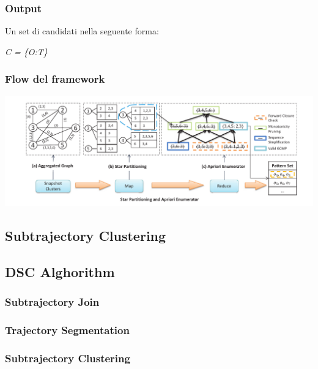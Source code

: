 \documentclass{beamer}
\begin{document}
\begin{frame}
	\frametitle{Output}
	Un set di candidati nella seguente forma: 
	
	\begin{center}
		\huge  \textit{C = \{O:T\}} 
	\end{center}




	
	
\end{frame}

\begin{frame}
	\frametitle{Flow del framework}

\includegraphics[scale=0.25]{GCMP-flow}
	
\end{frame}




\subsection{Subtrajectory Clustering}

\subsection{DSC Alghorithm}

\subsubsection{Subtrajectory Join}

\subsubsection{Trajectory Segmentation}

\subsubsection{Subtrajectory Clustering}




\begin{frame}
\titlepage %
\end{frame}

\end{document}
